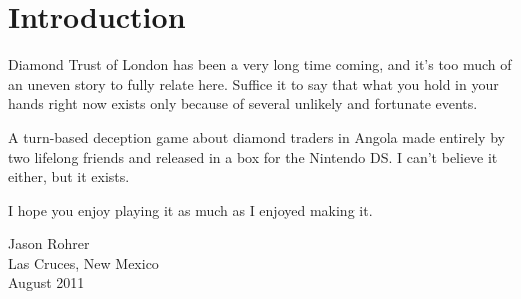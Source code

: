 \documentclass[8pt]{extbook}
\makeatletter
\newcommand{\startopenany}{\@openrightfalse}
\newcommand{\stopopenany}{\@openrighttrue}
\makeatother
\begin{document}
\frontmatter

\tableofcontents


\startopenany
{}
\chapter*{Introduction}

Diamond Trust of London has been a very long time coming, and it's too much of an uneven story to fully relate here.  Suffice it to say that what you hold in your hands right now exists only because of several unlikely and fortunate events.  

A turn-based deception game about diamond traders in Angola made entirely by two lifelong friends and released in a box for the Nintendo DS.  I can't believe it either, but it exists.  

I hope you enjoy playing it as much as I enjoyed making it.

\begin{flushright}
\begin{minipage}{1.5in}
Jason Rohrer\\
Las Cruces, New Mexico\\
August 2011
\end{minipage}
\end{flushright}


\stopopenany

\mainmatter





\makeatletter
\def\myEndPart{\vfil


              \if@twoside
                \null
                \thispagestyle{empty}%
                \newpage
              \fi
              \if@tempswa
                \twocolumn
              \fi}
\makeatother

\makeatletter
\def\standardEndPart{\vfil\newpage
              \if@twoside
                \null
                \thispagestyle{empty}%
                \newpage
              \fi
              \if@tempswa
                \twocolumn
              \fi}
\makeatother




\makeatletter
\renewcommand\@endpart{\myEndPart}
\makeatother

\end{document}
